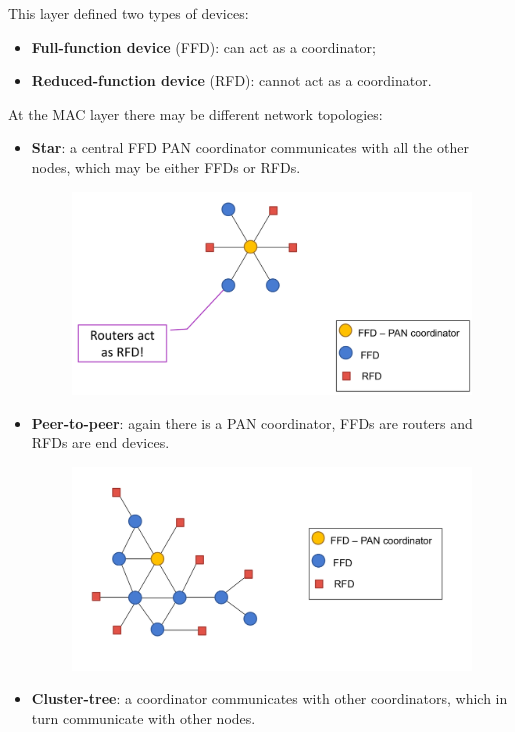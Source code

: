This layer defined two types of devices:
\begin{itemize}
   \item \textbf{Full-function device} (FFD): can act as a coordinator;
   \item \textbf{Reduced-function device} (RFD): cannot act as a coordinator.
\end{itemize}


At the MAC layer there may be different network topologies:
\begin{itemize}
   \item \textbf{Star}: a central FFD PAN coordinator communicates with all the other nodes, which may be either FFDs or RFDs.
   \begin{figure}[htbp]
      \centering
      \includegraphics{images/802_star.png}
      \label{fig:802_star}
   \end{figure}
   \item \textbf{Peer-to-peer}: again there is a PAN coordinator, FFDs are routers and RFDs are end devices.
   \begin{figure}[htbp]
      \centering
      \includegraphics{images/802_p2p.png}
      \label{fig:802_p2p}
   \end{figure}
   \item \textbf{Cluster-tree}: a coordinator communicates with other coordinators, which in turn communicate with other nodes.
   

\end{itemize}
